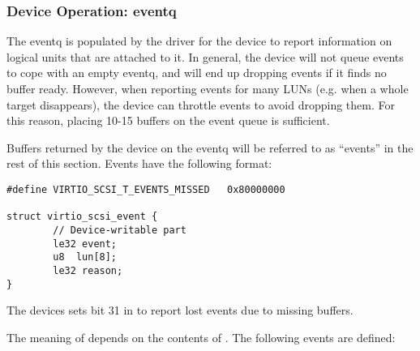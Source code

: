 \subsubsection{Device Operation: eventq}\label{sec:Device Types / SCSI Host Device / Device Operation / Device Operation: eventq}

The eventq is populated by the driver for the device to report information on logical
units that are attached to it. In general, the device will not
queue events to cope with an empty eventq, and will end up
dropping events if it finds no buffer ready. However, when
reporting events for many LUNs (e.g. when a whole target
disappears), the device can throttle events to avoid dropping
them. For this reason, placing 10-15 buffers on the event queue
is sufficient.

Buffers returned by the device on the eventq will be referred to
as ``events'' in the rest of this section. Events have the
following format:

\begin{lstlisting}
#define VIRTIO_SCSI_T_EVENTS_MISSED   0x80000000

struct virtio_scsi_event {
        // Device-writable part
        le32 event;
        u8  lun[8];
        le32 reason;
}
\end{lstlisting}

The devices sets bit 31 in  to report lost events
due to missing buffers.

The meaning of  depends on the
contents of . The following events are defined:

